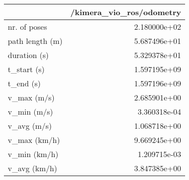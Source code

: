 \begin{tabular}{lr}
\toprule
{} &  /kimera\_vio\_ros/odometry \\
\midrule
nr. of poses    &              2.180000e+02 \\
path length (m) &              5.687496e+01 \\
duration (s)    &              5.329378e+01 \\
t\_start (s)     &              1.597195e+09 \\
t\_end (s)       &              1.597196e+09 \\
v\_max (m/s)     &              2.685901e+00 \\
v\_min (m/s)     &              3.360318e-04 \\
v\_avg (m/s)     &              1.068718e+00 \\
v\_max (km/h)    &              9.669245e+00 \\
v\_min (km/h)    &              1.209715e-03 \\
v\_avg (km/h)    &              3.847385e+00 \\
\bottomrule
\end{tabular}
